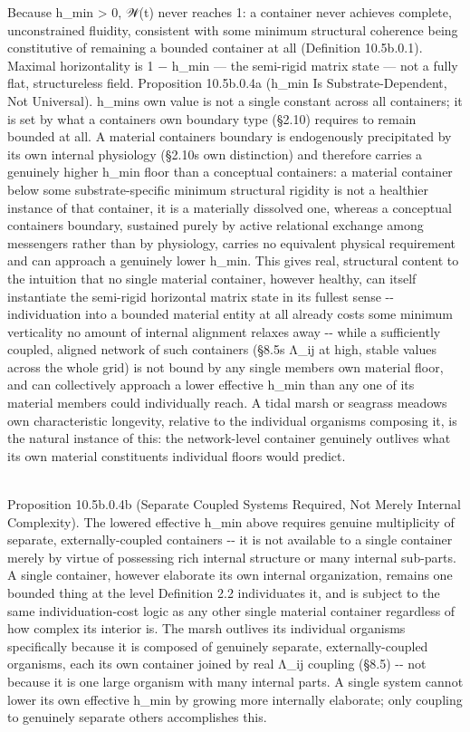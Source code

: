 \documentclass[
]{article}
\begin{document}
Because h\_min \textgreater{} 0, 𝒲(t) never reaches 1: a container never
achieves complete, unconstrained fluidity, consistent with some minimum
structural coherence being constitutive of remaining a bounded container
at all (Definition 10.5b.0.1). Maximal horizontality is 1 − h\_min ---
the semi-rigid matrix state --- not a fully flat, structureless field.
Proposition 10.5b.0.4a (h\_min Is Substrate-Dependent, Not Universal).
h\_min\textquotesingle s own value is not a single constant across all
containers; it is set by what a container\textquotesingle s own boundary
type (§2.10) requires to remain bounded at all. A material
container\textquotesingle s boundary is endogenously precipitated by its
own internal physiology (§2.10\textquotesingle s own distinction) and
therefore carries a genuinely higher h\_min floor than a conceptual
container\textquotesingle s: a material container below some
substrate-specific minimum structural rigidity is not a healthier
instance of that container, it is a materially dissolved one, whereas a
conceptual container\textquotesingle s boundary, sustained purely by
active relational exchange among messengers rather than by physiology,
carries no equivalent physical requirement and can approach a genuinely
lower h\_min. This gives real, structural content to the intuition that
no single material container, however healthy, can itself instantiate
the semi-rigid horizontal matrix state in its fullest sense -\/-
individuation into a bounded material entity at all already costs some
minimum verticality no amount of internal alignment relaxes away -\/-
while a sufficiently coupled, aligned network of such containers
(§8.5\textquotesingle s Λ\_ij at high, stable values across the whole
grid) is not bound by any single member\textquotesingle s own material
floor, and can collectively approach a lower effective h\_min than any
one of its material members could individually reach. A tidal marsh or
seagrass meadow\textquotesingle s own characteristic longevity, relative
to the individual organisms composing it, is the natural instance of
this: the network-level container genuinely outlives what its own
material constituents\textquotesingle{} individual floors would
predict.\\
\strut \\
Proposition 10.5b.0.4b (Separate Coupled Systems Required, Not Merely
Internal Complexity). The lowered effective h\_min above requires
genuine multiplicity of separate, externally-coupled containers -\/- it
is not available to a single container merely by virtue of possessing
rich internal structure or many internal sub-parts. A single container,
however elaborate its own internal organization, remains one bounded
thing at the level Definition 2.2 individuates it, and is subject to the
same individuation-cost logic as any other single material container
regardless of how complex its interior is. The marsh outlives its
individual organisms specifically because it is composed of genuinely
separate, externally-coupled organisms, each its own container joined by
real Λ\_ij coupling (§8.5) -\/- not because it is one large organism
with many internal parts. A single system cannot lower its own effective
h\_min by growing more internally elaborate; only coupling to genuinely
separate others accomplishes this.
\end{document}
